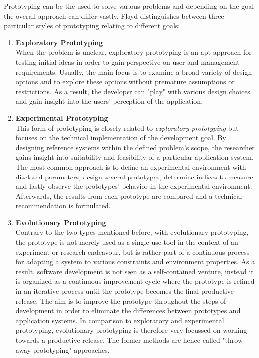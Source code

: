     Prototyping can be the used to solve various problems and depending on the goal the overall approach can differ vastly. Floyd\autocite{Floyd1984APrototyping} distinguishes between three particular styles of prototyping relating to different goals:
    
    \begin{enumerate}
        \item \textbf{Exploratory Prototyping}\\
            When the problem is unclear, exploratory prototyping is an apt approach for testing initial ideas in order to gain perspective on user and management requirements. Usually, the main focus is to examine a broad variety of design options and to explore these options without premature assumptions or restrictions. As a result, the developer can "play" with various design choices and gain insight into the users' perception of the application. 
        \item \textbf{Experimental Prototyping}\\
            This form of prototyping is closely related to \textit{exploratory prototyping} but focuses on the technical implementation of the development goal. By designing reference systems within the defined problem's scope, the researcher gains insight into suitability and feasibility of a particular application system. The most common approach is to define an experimental environment with disclosed parameters, design several prototypes, determine indices to measure and lastly observe the prototypes' behavior in the experimental environment. Afterwards, the results from each prototype are compared and a technical recommendation is formulated. 
        \item \textbf{Evolutionary Prototyping}\\
            Contrary to the two types mentioned before, with evolutionary prototyping, the prototype is not merely used as a single-use tool in the context of an experiment or research endeavour, but is rather part of a continuous process for adapting a system to various constraints and environment properties. As a result, software development is not seen as a self-contained venture, instead it is organized as a continuous improvement cycle where the prototype is refined in an iterative process until the prototype becomes the final productive release. The aim is to improve the prototype throughout the steps of development in order to eliminate the differences between prototypes and application systems. In comparison to exploratory and experimental prototyping, evolutionary prototyping is therefore very focussed on working towards a productive release. The former methods are hence called "throw-away prototyping" approaches.\autocite{Crinnion1991EvolutionaryMethodology}
    \end{enumerate}
    
